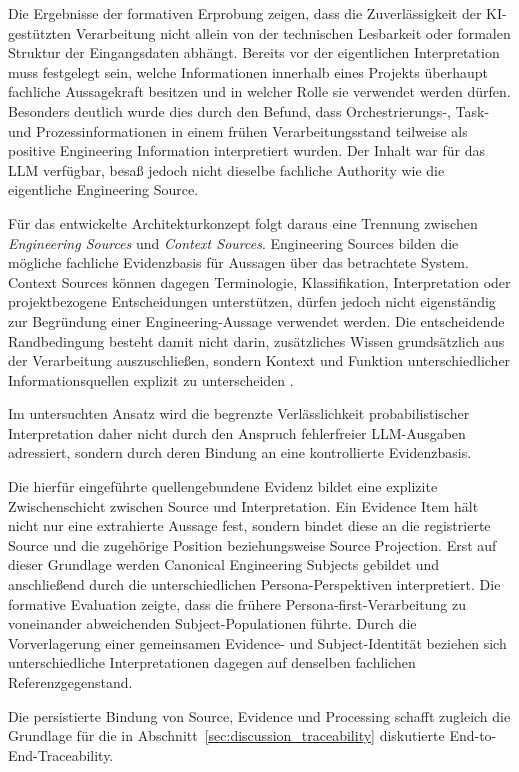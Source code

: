 Die Ergebnisse der formativen Erprobung zeigen, dass die Zuverlässigkeit der
KI-gestützten Verarbeitung nicht allein von der technischen Lesbarkeit oder
formalen Struktur der Eingangsdaten abhängt. Bereits vor der eigentlichen
Interpretation muss festgelegt sein, welche Informationen innerhalb eines
Projekts überhaupt fachliche Aussagekraft besitzen und in welcher Rolle sie
verwendet werden dürfen. Besonders deutlich wurde dies durch den Befund, dass
Orchestrierungs-, Task- und Prozessinformationen in einem frühen
Verarbeitungsstand teilweise als positive Engineering Information
interpretiert wurden. Der Inhalt war für das LLM verfügbar, besaß jedoch nicht
dieselbe fachliche Authority wie die eigentliche Engineering Source.

Für das entwickelte Architekturkonzept folgt daraus eine Trennung zwischen
\emph{Engineering Sources} und \emph{Context Sources}. Engineering Sources
bilden die mögliche fachliche Evidenzbasis für Aussagen über das betrachtete
System. Context Sources können dagegen Terminologie, Klassifikation,
Interpretation oder projektbezogene Entscheidungen unterstützen, dürfen jedoch
nicht eigenständig zur Begründung einer Engineering-Aussage verwendet werden.
Die entscheidende Randbedingung besteht damit nicht darin, zusätzliches Wissen
grundsätzlich aus der Verarbeitung auszuschließen, sondern Kontext und Funktion
unterschiedlicher Informationsquellen explizit zu unterscheiden
\cite{Bressan.2000}.

Im untersuchten Ansatz wird die begrenzte Verlässlichkeit probabilistischer
Interpretation daher nicht durch den Anspruch fehlerfreier LLM-Ausgaben
adressiert, sondern durch deren Bindung an eine kontrollierte Evidenzbasis.

Die hierfür eingeführte quellengebundene Evidenz bildet eine explizite
Zwischenschicht zwischen Source und Interpretation. Ein Evidence Item hält
nicht nur eine extrahierte Aussage fest, sondern bindet diese an die
registrierte Source und die zugehörige Position beziehungsweise
Source Projection. Erst auf dieser Grundlage werden Canonical Engineering
Subjects gebildet und anschließend durch die unterschiedlichen
Persona-Perspektiven interpretiert. Die formative Evaluation zeigte, dass die
frühere Persona-first-Verarbeitung zu voneinander abweichenden
Subject-Populationen führte. Durch die Vorverlagerung einer gemeinsamen
Evidence- und Subject-Identität beziehen sich unterschiedliche
Interpretationen dagegen auf denselben fachlichen Referenzgegenstand.

Die persistierte Bindung von Source, Evidence und Processing schafft zugleich
die Grundlage für die in
Abschnitt~\ref{sec:discussion_traceability} diskutierte
End-to-End-Traceability.

